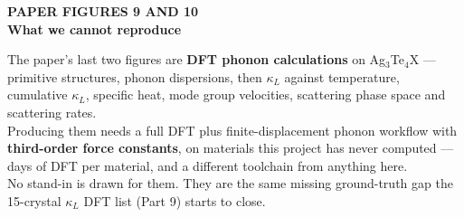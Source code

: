 \begin{frame}[plain]
\vspace{0.9cm}
\begin{center}
{\color{SlideAmber}\bfseries\sffamily\large PAPER FIGURES 9 AND 10}\\[8pt]
{\color{white}\bfseries\headingfont\fontsize{25}{30}\selectfont
  What we cannot reproduce}\\[12pt]
\begin{minipage}{0.80\linewidth}
{\color{Subtle}\sffamily\footnotesize
The paper's last two figures are \textbf{DFT phonon calculations} on
Ag$_3$Te$_4$X --- primitive structures, phonon dispersions, then $\kappa_L$
against temperature, cumulative $\kappa_L$, specific heat, mode group
velocities, scattering phase space and scattering rates.\\[8pt]
Producing them needs a full DFT plus finite-displacement phonon workflow with
\textbf{third-order force constants}, on materials this project has never
computed --- days of DFT per material, and a different toolchain from anything
here.\\[8pt]
{\color{white}No stand-in is drawn for them.} They are the same missing
ground-truth gap the 15-crystal $\kappa_L$ DFT list (Part 9) starts to close.}
\end{minipage}
\end{center}
\end{frame}


